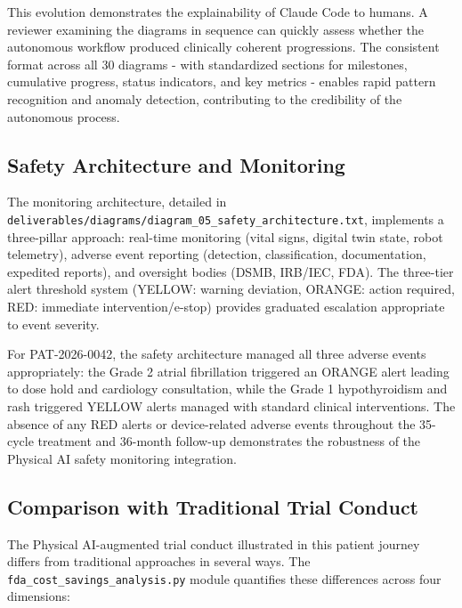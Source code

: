 This evolution demonstrates the explainability of Claude Code to humans. A reviewer examining the diagrams in sequence can quickly assess whether the autonomous workflow produced clinically coherent progressions. The consistent format across all 30 diagrams - with standardized sections for milestones, cumulative progress, status indicators, and key metrics - enables rapid pattern recognition and anomaly detection, contributing to the credibility of the autonomous process.

\subsection{Safety Architecture and Monitoring}

The monitoring architecture, detailed in \texttt{deliverables/diagrams/diagram\_05\_safety\_architecture.txt}, implements a three-pillar approach: real-time monitoring (vital signs, digital twin state, robot telemetry), adverse event reporting (detection, classification, documentation, expedited reports), and oversight bodies (DSMB, IRB/IEC, FDA). The three-tier alert threshold system (YELLOW: warning deviation, ORANGE: action required, RED: immediate intervention/e-stop) provides graduated escalation appropriate to event severity.

For PAT-2026-0042, the safety architecture managed all three adverse events appropriately: the Grade 2 atrial fibrillation triggered an ORANGE alert leading to dose hold and cardiology consultation, while the Grade 1 hypothyroidism and rash triggered YELLOW alerts managed with standard clinical interventions. The absence of any RED alerts or device-related adverse events throughout the 35-cycle treatment and 36-month follow-up demonstrates the robustness of the Physical AI safety monitoring integration.

\subsection{Comparison with Traditional Trial Conduct}

The Physical AI-augmented trial conduct illustrated in this patient journey differs from traditional approaches in several ways. The \texttt{fda\_cost\_savings\_analysis.py} module quantifies these differences across four dimensions:

